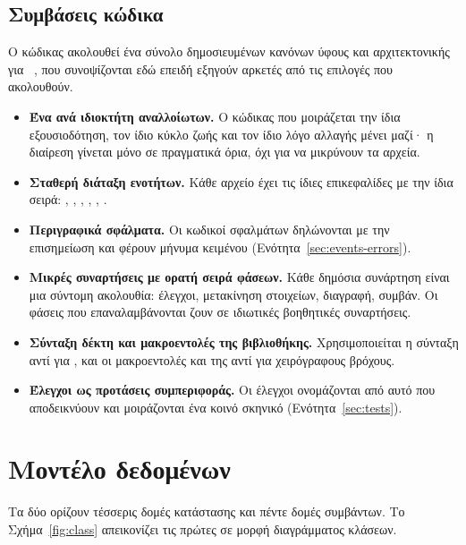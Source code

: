 \subsection{Συμβάσεις κώδικα}
\label{sec:conventions}

Ο κώδικας ακολουθεί ένα σύνολο δημοσιευμένων κανόνων ύφους και αρχιτεκτονικής για
~\cite{sui-move-skills}, που συνοψίζονται εδώ επειδή εξηγούν αρκετές από
τις επιλογές που ακολουθούν.

\begin{itemize}[nosep]
  \item \textbf{Ένα  ανά ιδιοκτήτη αναλλοίωτων.} Ο κώδικας που μοιράζεται την
        ίδια εξουσιοδότηση, τον ίδιο κύκλο ζωής και τον ίδιο λόγο αλλαγής μένει μαζί· η
        διαίρεση γίνεται μόνο σε πραγματικά όρια, όχι για να μικρύνουν τα αρχεία.
  \item \textbf{Σταθερή διάταξη ενοτήτων.} Κάθε αρχείο έχει τις ίδιες επικεφαλίδες με την
        ίδια σειρά: , , ,
        , , .
  \item \textbf{Περιγραφικά σφάλματα.} Οι κωδικοί σφαλμάτων δηλώνονται με την επισημείωση
        \code{\#[error(code = N)]} και φέρουν μήνυμα κειμένου (Ενότητα~\ref{sec:events-errors}).
  \item \textbf{Μικρές συναρτήσεις με ορατή σειρά φάσεων.} Κάθε δημόσια συνάρτηση είναι μια
        σύντομη ακολουθία: έλεγχοι, μετακίνηση στοιχείων, διαγραφή, συμβάν. Οι φάσεις που
        επαναλαμβάνονται ζουν σε ιδιωτικές βοηθητικές συναρτήσεις.
  \item \textbf{Σύνταξη δέκτη και μακροεντολές της βιβλιοθήκης.} Χρησιμοποιείται η σύνταξη
         αντί για , και οι
        μακροεντολές  και  της  αντί για χειρόγραφους βρόχους.
  \item \textbf{Έλεγχοι ως προτάσεις συμπεριφοράς.} Οι έλεγχοι ονομάζονται από αυτό που
        αποδεικνύουν και μοιράζονται ένα κοινό σκηνικό (Ενότητα~\ref{sec:tests}).
\end{itemize}

\section{Μοντέλο δεδομένων}
\label{sec:data-model}

Τα δύο  ορίζουν τέσσερις δομές κατάστασης και πέντε δομές συμβάντων.
Το Σχήμα~\ref{fig:class} απεικονίζει τις πρώτες σε μορφή διαγράμματος κλάσεων.

